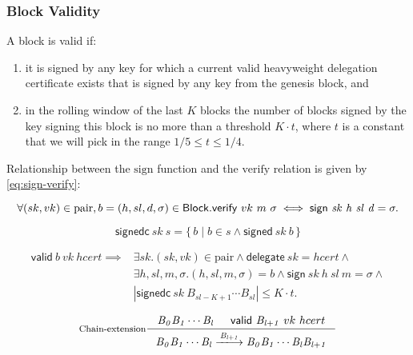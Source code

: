 \documentclass[11pt,a4paper]{article}
\newcommand\Set[2]{\{\,#1\mid#2\,\}}
\newcommand{\var}[1]{\mathit{#1}}
\newcommand{\fun}[1]{\mathsf{#1}}
\newcommand{\type}[1]{\mathsf{#1}}
\newcommand{\trans}[2]{\xlongrightarrow[\textsc{#1}]{#2}}
\newcommand{\Block}{\type{Block}}
\newcommand{\signname}{sign}
\newcommand{\signedname}{signed}
\newcommand{\signedseq}{signedc}
\newcommand{\verifyname}{verify}
\newcommand{\delegatename}{delegate}
\newcommand{\validname}{valid}
\newcommand{\keypairname}{pair}
\newcommand{\sign}[4]{\fun{\signname}\ \var{#1} ~ \var{#2} ~ \var{#3} ~ \var{#4}}
\newcommand{\signed}[2]{\fun{\signedname}\ \var{#1} ~ \var{#2}}
\newcommand{\signedwindow}[2]{\fun{\signedseq}\ \var{#1} ~ \var{#2}}
\newcommand{\verify}[3]{\fun{\verifyname} ~ #1 ~ #2 ~ #3}
\newcommand{\delegate}[1]{\fun{\delegatename}\ \var{#1}}
\newcommand{\valid}[3]{\fun{\validname} ~ #1 ~ #2 ~ #3}
\begin{document}
\subsubsection{Block Validity}
\label{sec:block-valid}
A block is valid if:
\begin{enumerate}
\item it is signed by any key for which a current valid heavyweight delegation
  certificate exists that is signed by any key from the genesis block, and
\item in the rolling window of the last $K$ blocks the number of blocks signed
  by the key signing this block is no more than a threshold $K \cdot t$, where
  $t$ is a constant that we will pick in the range $1/5 \leq t \leq 1/4$.
\end{enumerate}


Relationship between the $\text{\signname}$ function and the
$\text{\verifyname}$ relation is given by \eqref{eq:sign-verify}:

\begin{equation}
  \label{eq:sign-verify}
  \forall (sk, vk) \in \text{\keypairname}, b = (h, sl, d, \sigma) \in \Block.\\
  \verify{vk}{m}{\sigma} \iff \sign{sk}{h}{sl}{d} = \sigma.
\end{equation}

\begin{equation}
  \label{eq:signed-window}
  \signedwindow{sk}{s} = \Set{b}{b \in s \wedge \signed{sk}{b}}
\end{equation}

\begin{align}
  \label{eq:valid-block}
    \valid{b}{vk}{hcert} \implies &
      \exists sk. (sk, vk) \in \text{\keypairname} \wedge
      \delegate{sk} = hcert \wedge \\
      & \exists h, sl, m, \sigma. (h, sl, m, \sigma) = b \wedge
        \sign{sk}{h}{sl}{m} = \sigma \wedge \\
      & | \signedwindow{sk}{\var{B_{sl-K+1}} \cdots \var{B_{sl}}} | \leq K \cdot t.
\end{align}

\begin{equation}
  \label{eq:chain-extension}
  \inference[Chain-extension]
  {\var{B_0}\var{B_1}\cdots\var{B_l} & \valid{\var{B_{l+1}}}{vk}{hcert}
  }
  {{\var{B_0}\var{B_1}\cdots\var{B_l}} \trans{}{\var{B_{l+1}}} {\var{B_0}\var{B_1}\cdots\var{B_l}\var{B_{l+1}}}}
\end{equation}
\end{document}
